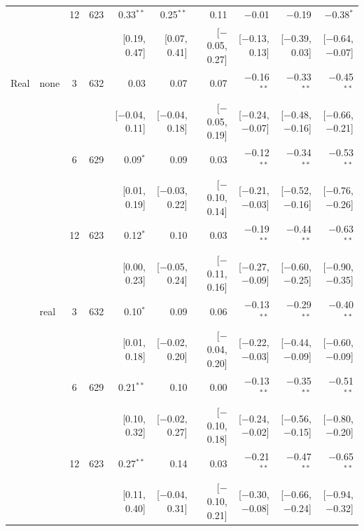 \begin{longtable}{llcrrrrrrr}
 &  & 12 & 623 & 0.33$^{**}$ & 0.25$^{**}$ & 0.11 & $-$0.01 & $-$0.19 & $-$0.38$^{*}$\\
 & & & & {\scriptsize [0.19, 0.47]} & {\scriptsize [0.07, 0.41]} & {\scriptsize [$-$0.05, 0.27]} & {\scriptsize [$-$0.13, 0.13]} & {\scriptsize [$-$0.39, 0.03]} & {\scriptsize [$-$0.64, $-$0.07]}\\
\addlinespace
Real & none & 3 & 632 & 0.03 & 0.07 & 0.07 & $-$0.16$^{**}$ & $-$0.33$^{**}$ & $-$0.45$^{**}$\\
 & & & & {\scriptsize [$-$0.04, 0.11]} & {\scriptsize [$-$0.04, 0.18]} & {\scriptsize [$-$0.05, 0.19]} & {\scriptsize [$-$0.24, $-$0.07]} & {\scriptsize [$-$0.48, $-$0.16]} & {\scriptsize [$-$0.66, $-$0.21]}\\
 &  & 6 & 629 & 0.09$^{*}$ & 0.09 & 0.03 & $-$0.12$^{**}$ & $-$0.34$^{**}$ & $-$0.53$^{**}$\\
 & & & & {\scriptsize [0.01, 0.19]} & {\scriptsize [$-$0.03, 0.22]} & {\scriptsize [$-$0.10, 0.14]} & {\scriptsize [$-$0.21, $-$0.03]} & {\scriptsize [$-$0.52, $-$0.16]} & {\scriptsize [$-$0.76, $-$0.26]}\\
 &  & 12 & 623 & 0.12$^{*}$ & 0.10 & 0.03 & $-$0.19$^{**}$ & $-$0.44$^{**}$ & $-$0.63$^{**}$\\
 & & & & {\scriptsize [0.00, 0.23]} & {\scriptsize [$-$0.05, 0.24]} & {\scriptsize [$-$0.11, 0.16]} & {\scriptsize [$-$0.27, $-$0.09]} & {\scriptsize [$-$0.60, $-$0.25]} & {\scriptsize [$-$0.90, $-$0.35]}\\
 & real & 3 & 632 & 0.10$^{*}$ & 0.09 & 0.06 & $-$0.13$^{**}$ & $-$0.29$^{**}$ & $-$0.40$^{**}$\\
 & & & & {\scriptsize [0.01, 0.18]} & {\scriptsize [$-$0.02, 0.20]} & {\scriptsize [$-$0.04, 0.20]} & {\scriptsize [$-$0.22, $-$0.03]} & {\scriptsize [$-$0.44, $-$0.09]} & {\scriptsize [$-$0.60, $-$0.09]}\\
 &  & 6 & 629 & 0.21$^{**}$ & 0.10 & 0.00 & $-$0.13$^{**}$ & $-$0.35$^{**}$ & $-$0.51$^{**}$\\
 & & & & {\scriptsize [0.10, 0.32]} & {\scriptsize [$-$0.02, 0.27]} & {\scriptsize [$-$0.10, 0.18]} & {\scriptsize [$-$0.24, $-$0.02]} & {\scriptsize [$-$0.56, $-$0.15]} & {\scriptsize [$-$0.80, $-$0.20]}\\
 &  & 12 & 623 & 0.27$^{**}$ & 0.14 & 0.03 & $-$0.21$^{**}$ & $-$0.47$^{**}$ & $-$0.65$^{**}$\\
 & & & & {\scriptsize [0.11, 0.40]} & {\scriptsize [$-$0.04, 0.31]} & {\scriptsize [$-$0.10, 0.21]} & {\scriptsize [$-$0.30, $-$0.08]} & {\scriptsize [$-$0.66, $-$0.24]} & {\scriptsize [$-$0.94, $-$0.32]}\\

\end{longtable}

